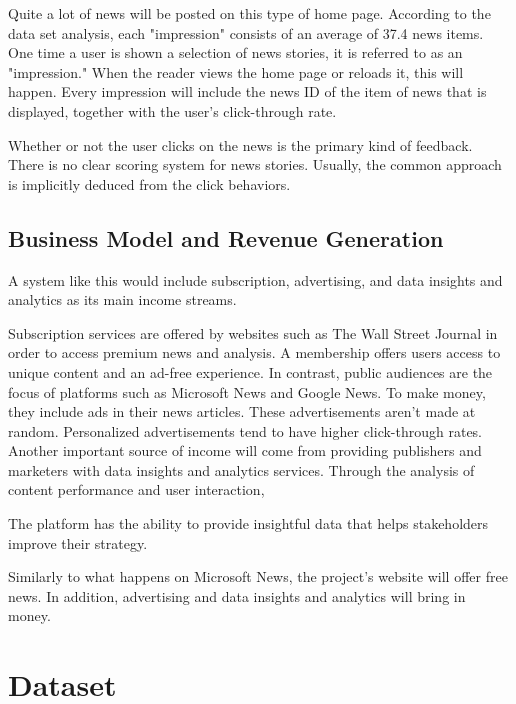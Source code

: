 \documentclass[9pt,twocolumn,twoside,lineno]{gsajnl}
\begin{document}
Quite a lot of news will be posted on this type of home page. According to the data set analysis, each "impression" consists of an average of 37.4 news items. One time a user is shown a selection of news stories, it is referred to as an "impression." When the reader views the home page or reloads it, this will happen. Every impression will include the news ID of the item of news that is displayed, together with the user's click-through rate.

Whether or not the user clicks on the news is the primary kind of feedback. There is no clear scoring system for news stories. Usually, the common approach is implicitly deduced from the click behaviors.

\subsection{Business Model and Revenue Generation}
A system like this would include subscription, advertising, and data insights and analytics as its main income streams.

Subscription services are offered by websites such as The Wall Street Journal in order to access premium news and analysis. A membership offers users access to unique content and an ad-free experience. In contrast, public audiences are the focus of platforms such as Microsoft News and Google News. To make money, they include ads in their news articles. These advertisements aren't made at random. Personalized advertisements tend to have higher click-through rates. Another important source of income will come from providing publishers and marketers with data insights and analytics services. Through the analysis of content performance and user interaction,
 
The platform has the ability to provide insightful data that helps stakeholders improve their strategy.

Similarly to what happens on Microsoft News, the project's website will offer free news. In addition, advertising and data insights and analytics will bring in money.

\section{Dataset}
\end{document}
